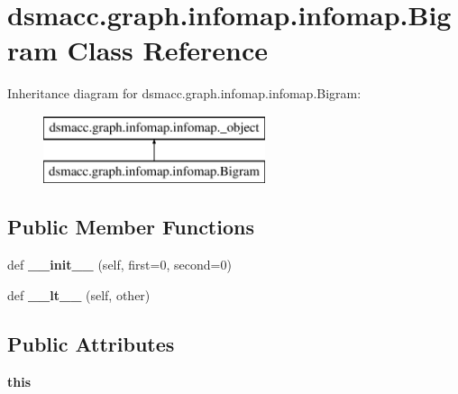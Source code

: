 \hypertarget{classdsmacc_1_1graph_1_1infomap_1_1infomap_1_1Bigram}{}\section{dsmacc.\+graph.\+infomap.\+infomap.\+Bigram Class Reference}
\label{classdsmacc_1_1graph_1_1infomap_1_1infomap_1_1Bigram}
Inheritance diagram for dsmacc.\+graph.\+infomap.\+infomap.\+Bigram\+:\begin{figure}[H]
\begin{center}
\leavevmode
\includegraphics[height=2.000000cm]{classdsmacc_1_1graph_1_1infomap_1_1infomap_1_1Bigram}
\end{center}
\end{figure}
\subsection*{Public Member Functions}
\begin{DoxyCompactItemize}
\item 
\mbox{\label{classdsmacc_1_1graph_1_1infomap_1_1infomap_1_1Bigram_abd8e815738391c19a16d738334e36a9f}} 
def {\bfseries \+\_\+\+\_\+init\+\_\+\+\_\+} (self, first=0, second=0)
\item 
\mbox{\label{classdsmacc_1_1graph_1_1infomap_1_1infomap_1_1Bigram_a0ae6544a19f342d6beb9270444d1354c}} 
def {\bfseries \+\_\+\+\_\+lt\+\_\+\+\_\+} (self, other)
\end{DoxyCompactItemize}
\subsection*{Public Attributes}
\begin{DoxyCompactItemize}
\item 
\mbox{\label{classdsmacc_1_1graph_1_1infomap_1_1infomap_1_1Bigram_a788eee377d98781b14b66db2c0412e34}} 
{\bfseries this}
\end{DoxyCompactItemize}

